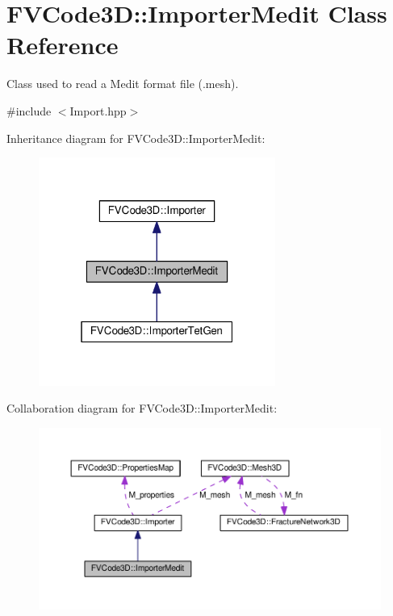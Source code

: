 \hypertarget{classFVCode3D_1_1ImporterMedit}{}\section{F\+V\+Code3D\+:\+:Importer\+Medit Class Reference}
\label{classFVCode3D_1_1ImporterMedit}


Class used to read a Medit format file (.mesh).  




{\ttfamily \#include $<$Import.\+hpp$>$}



Inheritance diagram for F\+V\+Code3D\+:\+:Importer\+Medit\+:
\nopagebreak
\begin{figure}[H]
\begin{center}
\leavevmode
\includegraphics[width=220pt]{classFVCode3D_1_1ImporterMedit__inherit__graph}
\end{center}
\end{figure}


Collaboration diagram for F\+V\+Code3D\+:\+:Importer\+Medit\+:
\nopagebreak
\begin{figure}[H]
\begin{center}
\leavevmode
\includegraphics[width=350pt]{classFVCode3D_1_1ImporterMedit__coll__graph}
\end{center}
\end{figure}
